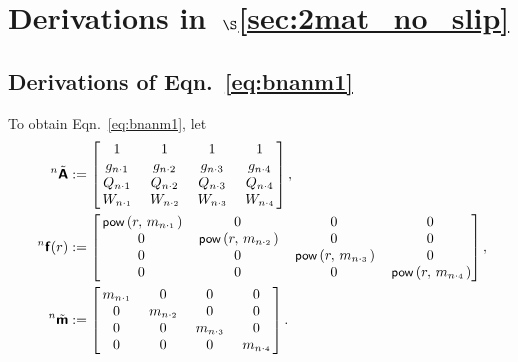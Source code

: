 \documentclass[preprint,12pt,times]{elsarticle}
\newcommand{\minus}[1]{\check{#1}}
\numberwithin{equation}{section}
\renewcommand{\u}[1]{\boldsymbol{#1}}
\newcommand{\usf}[1]{\u{\mathsf #1}}
\newcommand{\pr}[1]{\left( #1 \right)}
\newcommand{\p}{\,\textsf{\small pow}}
\newcommand{\msub}[2]{
\IfEqCase{#2}{
      {i}{\, m_{#1\cdot #2}\,}%
  }[\,m_{#1\cdot {\scriptscriptstyle #2}}\,]}
\newcommand{\gsub}[2]{g_{#1\cdot #2}}
\newcommand{\Qsub}[2]{Q_{#1\cdot #2}}
\newcommand{\Wsub}[2]{
\IfEqCase{#2}{
      {i}{\, W_{#1\cdot #2}\,}%
  }[\,W_{#1\cdot {\scriptscriptstyle #2}}\,]}
\renewcommand{\>}{$\Rightarrow$}
\begin{document}
\section{Derivations in~$\S$\ref{sec:2mat_no_slip}}
\label{Appen:derivations}
\subsection{Derivations of Eqn.~\eqref{eq:bnanm1}}
\label{Appen:Eqn315}
To obtain Eqn.~\eqref{eq:bnanm1}, let
\begin{subequations}
\begin{align}
	~^{n}\tilde{\usf{A}}
	& :=
	\begin{bmatrix}
		1 & 1 & 1 & 1 \\
		\gsub{n}{1} & \gsub{n}{2} & \gsub{n}{3} & \gsub{n}{4} \\
		\Qsub{n}{1} & \Qsub{n}{2} & \Qsub{n}{3} & \Qsub{n}{4} \\
		\Wsub{n}{1} & \Wsub{n}{2} & \Wsub{n}{3} & \Wsub{n}{4}
	\end{bmatrix}, \\
  \label{eq:deff}
	~^{n}\usf{f}(r)
	& :=
	\begin{bmatrix}
		\p\pr{r,\msub{n}{1}} & 0 & 0 & 0 \\
		0 & \p\pr{r,\msub{n}{2}} & 0 & 0 \\
		0 & 0 & \p\pr{r,\msub{n}{3}} & 0 \\
		0 & 0 & 0 & \p\pr{r,\msub{n}{4}}
	\end{bmatrix}, \\
	~^{n}\tilde{\usf{m}}
	& :=
	\begin{bmatrix}
		\msub{n}{1} & 0 & 0 & 0 \\
		0 & \msub{n}{2} & 0 & 0 \\
		0 & 0 & \msub{n}{3} & 0 \\
		0 & 0 & 0 & \msub{n}{4}
	\end{bmatrix}.
	\end{align}
	\label{eq:C1}
\end{subequations}
\end{document}
